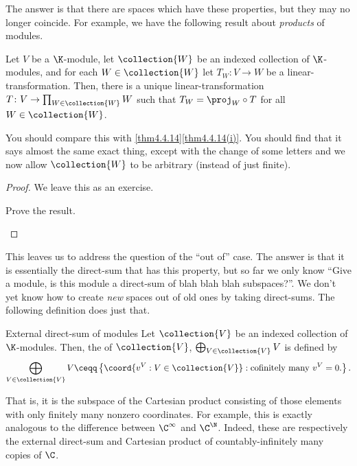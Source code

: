 The answer is that there are spaces which have these properties, but they may no longer coincide.  For example, we have the following result about \emph{products} of modules.
\begin{prp}{}{}
	Let $V$ be a $\K$-module, let $\collection{W}$ be an indexed collection of $\K$-modules, and for each $W\in \collection{W}$ let $T_W\colon V\rightarrow W$ be a linear-transformation.  Then, there is a unique linear-transformation $T\colon V\rightarrow \prod _{W\in \collection{W}}W$ such that $T_W=\proj _W\circ T$ for all $W\in \collection{W}$.
	\begin{rmk}
		You should compare this with \cref{thm4.4.14}\cref{thm4.4.14(i)}.  You should find that it says almost the same exact thing, except with the change of some letters and we now allow $\collection{W}$ to be arbitrary (instead of just finite).
	\end{rmk}
	\begin{proof}
		We leave this as an exercise.
		\begin{exr}[breakable=false]{}{}
			Prove the result.
		\end{exr}
	\end{proof}
\end{prp}
This leaves us to address the question of the ``out of'' case.  The answer is that it is essentially the direct-sum that has this property, but so far we only know ``Give a module, is this module a direct-sum of blah blah blah subspaces?''.  We don't yet know how to create \emph{new} spaces out of old ones by taking direct-sums.  The following definition does just that.
\begin{dfn}{External direct-sum of modules}{}
	Let $\collection{V}$ be an indexed collection of $\K$-modules.  Then, the  of $\collection{V}$, $\bigoplus _{V\in \collection{V}}V$ is defined by
	\begin{equation}
		\bigoplus _{V\in \collection{V}}V\ceqq \left\{ \coord{v^V:V\in \collection{V}}:\text{cofinitely many }v^V=0\text{.}\right\} .
	\end{equation}
	\begin{rmk}
		That is, it is the subspace of the Cartesian product consisting of those elements with only finitely many nonzero coordinates.  For example, this is exactly analogous to the difference between $\C ^{\infty}$ and $\C ^{\N}$.  Indeed, these are respectively the external direct-sum and Cartesian product of countably-infinitely many copies of $\C$. 
	\end{rmk}
\end{dfn}
